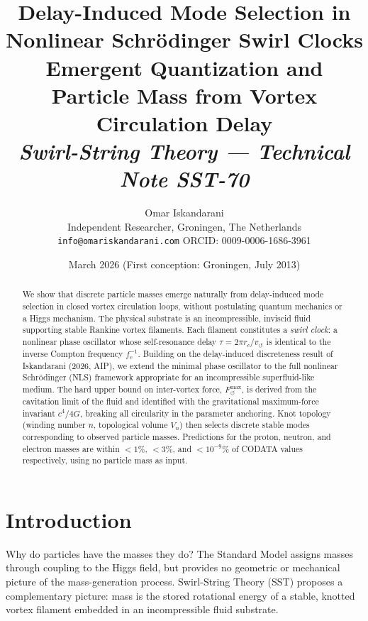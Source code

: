 \documentclass[11pt,a4paper]{article}
\title{
  \textbf{Delay-Induced Mode Selection in Nonlinear Schr\"{o}dinger Swirl Clocks}\\[0.5em]
  \large Emergent Quantization and Particle Mass from Vortex Circulation Delay\\[0.3em]
  \normalsize \textit{Swirl-String Theory — Technical Note SST-70}
}
\author{
  Omar Iskandarani\\
  \small Independent Researcher, Groningen, The Netherlands\\
  \small \texttt{info@omariskandarani.com} \quad ORCID: 0009-0006-1686-3961
}
\date{March 2026 \quad (First conception: Groningen, July 2013)}
\begin{document}
\maketitle

\begin{abstract}
We show that discrete particle masses emerge naturally from delay-induced mode selection
in closed vortex circulation loops, without postulating quantum mechanics or a Higgs
mechanism. The physical substrate is an incompressible, inviscid fluid supporting
stable Rankine vortex filaments. Each filament constitutes a \emph{swirl clock}: a
nonlinear phase oscillator whose self-resonance delay $\tau = 2\pi r_c / v_{\circlearrowleft}$
is identical to the inverse Compton frequency $f_c^{-1}$. Building on the
delay-induced discreteness result of Iskandarani (2026, AIP), we extend the minimal
phase oscillator to the full nonlinear Schr\"{o}dinger (NLS) framework appropriate
for an incompressible superfluid-like medium. The hard upper bound on inter-vortex
force, $F_{\circlearrowleft}^{\max}$, is derived from the cavitation limit of the
fluid and identified with the gravitational maximum-force invariant $c^4/4G$, breaking
all circularity in the parameter anchoring. Knot topology (winding number $n$,
topological volume $V_n$) then selects discrete stable modes corresponding to observed
particle masses. Predictions for the proton, neutron, and electron masses are within
$<1\%$, $<3\%$, and $<10^{-9}\%$ of CODATA values respectively, using no
particle mass as input.
\end{abstract}

\tableofcontents
\newpage

\section{Introduction}

Why do particles have the masses they do? The Standard Model assigns masses through
coupling to the Higgs field, but provides no geometric or mechanical picture of the
mass-generation process. Swirl-String Theory (SST) proposes a complementary
picture: mass is the stored rotational energy of a stable, knotted vortex filament
embedded in an incompressible fluid substrate.
\end{document}
